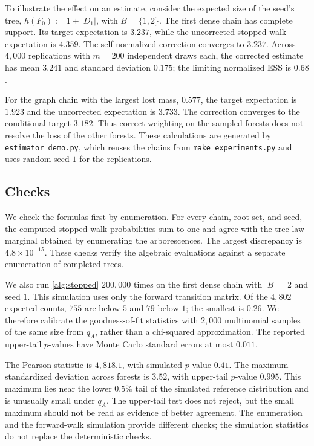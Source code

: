 \documentclass[onefignum,onetabnum,nohypdvips]{siamart250211}
\numberwithin{theorem}{section}
\numberwithin{equation}{section}
\begin{document}
To illustrate the effect on an estimate, consider the expected size
of the seed's tree, $h(F_0):=1+|D_1|$, with $B=\{1,2\}$.
The first dense chain has complete support. Its target expectation
is $3.237$, while the uncorrected stopped-walk expectation is $4.359$.
The self-normalized correction converges to $3.237$. Across
$4{,}000$ replications with $m=200$ independent draws each, the
corrected estimate has mean $3.241$ and standard deviation $0.175$;
the limiting normalized ESS is $0.68$.

For the graph chain with the largest lost mass, $0.577$, the target
expectation is $1.923$ and the uncorrected expectation is $3.733$.
The correction converges to the conditional target $3.182$. Thus
correct weighting on the sampled forests does not resolve the loss
of the other forests. These calculations are generated by
\nolinkurl{estimator_demo.py}, which reuses the chains from
\nolinkurl{make_experiments.py} and uses random seed $1$ for the
replications.

\subsection{Checks}
We check the formulas first by enumeration. For every chain, root
set, and seed, the computed stopped-walk probabilities sum to one
and agree with the tree-law marginal obtained by enumerating the
arborescences. The largest discrepancy is $4.8\times10^{-15}$.
These checks verify the algebraic evaluations against a separate
enumeration of completed trees.

We also run \cref{alg:stopped} $200{,}000$ times on the first dense
chain with $|B|=2$ and seed $1$. This simulation uses only the forward
transition matrix. Of the $4{,}802$ expected counts, $755$ are below
$5$ and $79$ below $1$; the smallest is $0.26$. We therefore calibrate
the goodness-of-fit statistics with $2{,}000$ multinomial samples of
the same size from $q_A$, rather than a chi-squared approximation.
The reported upper-tail $p$-values have Monte Carlo standard errors
at most $0.011$.

The Pearson statistic is $4{,}818.1$, with simulated $p$-value $0.41$.
The maximum standardized deviation across forests is $3.52$, with
upper-tail $p$-value $0.995$. This maximum lies near the lower
$0.5\%$ tail of the simulated reference distribution and is unusually
small under $q_A$. The upper-tail test does not reject, but the small
maximum should not be read as evidence of better agreement. The
enumeration and the forward-walk simulation provide different checks;
the simulation statistics do not replace the deterministic checks.



\end{document}
